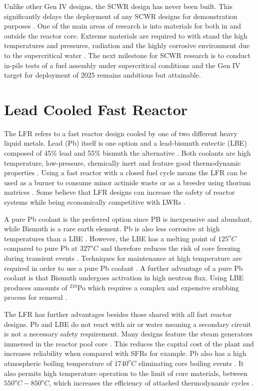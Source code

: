 \documentclass[journal]{IEEEtran}
\begin{document}
Unlike other Gen IV designs, the SCWR design has never been built.
This significantly delays the deployment of any SCWR designs for demonstration purposes \cite{GenIVForum}.
One of the main areas of research is into materials for both in and outside the reactor core.
Extreme materials are required to with stand the high temperatures and pressures, radiation and the highly corrosive environment due to the supercritical water \cite{GenIVForum}.
The next milestone for SCWR research is to conduct in-pile tests of a fuel assembly under supercritical conditions \cite{GenIVForum} and the Gen IV target for deployment of 2025 remains ambitious but attainable.

\section{Lead Cooled Fast Reactor}
The LFR refers to a fast reactor design cooled by one of two different heavy liquid metals. 
Lead (Pb) itself is one option and a lead-bismuth eutectic (LBE) composed of 45\% lead and 55\% bismuth the alternative \cite{Int2012}.
Both coolants are high temperature, low-pressure, chemically inert and feature good thermodynamic properties \cite{GenIVForum}.
Using a fast reactor with a closed fuel cycle means the LFR can be used as a burner to consume minor actinide waste or as a breeder using thorium matrices \cite{GenIVForum}.
Some believe that LFR designs can increase the safety of reactor systems while being economically competitive with LWRs \cite{Int2012}.

A pure Pb coolant is the preferred option since PB is inexpensive and abundant, while Bismuth is a rare earth element.
Pb is also less corrosive at high temperatures than a LBE \cite{Locatelli2013}.
However, the LBE has a melting point of $125^{o}C$ compared to pure Pb at $327^{o}C$ and therefore reduces the risk of core freezing during transient events \cite{Locatelli2013}.
Techniques for maintenance at high temperature are required in order to use a pure Pb coolant \cite{Int2012}.
A further advantage of a pure Pb coolant is that Bismuth undergoes activation in high neutron flux.
Using LBE produces amounts of $^{210}$Po which requires a complex and expensive srubbing process for removal \cite{Int2012}.

The LFR has further advantages besides those shared with all fast reactor designs.
Pb and LBE do not react with air or water meaning a secondary circuit is not a necessary safety requirement.
Many designs feature the steam generators immersed in the reactor pool core \cite{GenIVRoadmap}.
This reduces the capital cost of the plant and increases reliability when compared with SFRs for example.
Pb also has a high atmospheric boiling temperature of $1740^{o}C$ eliminating core boiling events \cite{Sakamoto2013194}.
It also permits high temperature operation to the limit of core materials, between $550^{o}C - 850^{o}C$, which increases the efficiency of attached thermodynamic cycles \cite{Marques2010a} .
\end{document}
